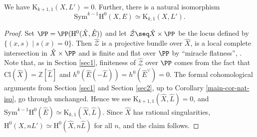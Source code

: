 \begin{lem}
\notready \label{green-pic2}
We have $\mathrm{K}_{k+1,1}(X,L')=0$. Further, there is a natural isomorphism $$\mathrm{Sym}^{k-1}\mathrm{H}^0(X,E) \simeq \mathrm{K}_{k,1}(X,L').$$
\end{lem}
\begin{proof}
Set $\PP=\PP(\mathrm{H}^0(\hat{X}, \hat{E}))$ and let $\hat{\mathcal{Z}} \seq \hat{X} \times \PP$ be the locus defined by $\{ (x,s) \; | \; s(x)=0 \}$. Then $\hat{\mathcal{Z}}$ is a projective bundle over $\hat{X}$, is a local complete intersection in $\hat{X} \times \PP$ and is finite and flat over $\PP$ by ``miracle flatness'', \cite[Prop.\ 6.1.5]{EGA}. Note that, as in Section \ref{sec1}, finiteness of $\hat{\mathcal{Z}}$ over $\PP$ comes from the fact that $\mathrm{Cl}(\hat{X})=\mathbb{Z}[\hat{L}]$ and $h^0(\hat{E}(-\hat{L}))=h^0(\hat{E}^{\vee})=0$. The formal cohomological arguments from Section \ref{sec1} and Section \ref{sec2}, up to Corollary \ref{main-cor-nat-iso}, go through unchanged. Hence we see $\mathrm{K}_{k+1,1}(\hat{X}, \hat{L})=0$, and $\mathrm{Sym}^{k-1}\mathrm{H}^0(\hat{E}) \simeq \mathrm{K}_{k,1}(\hat{X},\hat{L})$. Since $\hat{X}$ has rational singularities, $\mathrm{H}^0(X,nL') \simeq \mathrm{H}^0(\hat{X}, n\hat{L})$ for all $n$, and the claim follows.
\end{proof}

